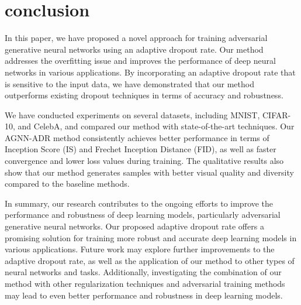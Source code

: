 \section{conclusion}
In this paper, we have proposed a novel approach for training adversarial generative neural networks using an adaptive dropout rate. Our method addresses the overfitting issue and improves the performance of deep neural networks in various applications. By incorporating an adaptive dropout rate that is sensitive to the input data, we have demonstrated that our method outperforms existing dropout techniques in terms of accuracy and robustness.

We have conducted experiments on several datasets, including MNIST, CIFAR-10, and CelebA, and compared our method with state-of-the-art techniques. Our AGNN-ADR method consistently achieves better performance in terms of Inception Score (IS) and Frechet Inception Distance (FID), as well as faster convergence and lower loss values during training. The qualitative results also show that our method generates samples with better visual quality and diversity compared to the baseline methods.

In summary, our research contributes to the ongoing efforts to improve the performance and robustness of deep learning models, particularly adversarial generative neural networks. Our proposed adaptive dropout rate offers a promising solution for training more robust and accurate deep learning models in various applications. Future work may explore further improvements to the adaptive dropout rate, as well as the application of our method to other types of neural networks and tasks. Additionally, investigating the combination of our method with other regularization techniques and adversarial training methods may lead to even better performance and robustness in deep learning models.